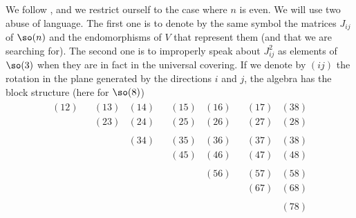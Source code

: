 We follow \cite{Dolan_son}, and we restrict ourself to the case where $n$ is even. We will use two abuse of language. The first one is to denote by the same symbol the matrices $J_{ij}$ of $\so(n)$ and the endomorphisms of $V$ that represent them (and that we are searching for). The second one is to improperly speak about $J_{ij}^2$ as elements of $\so(3)$ when they are in fact in the universal covering. If we denote by $(ij)$ the rotation in the plane generated by the directions $i$ and $j$, the algebra has the block structure (here for $\so(8)$)
\begin{equation}
	\begin{matrix}
		\begin{matrix}
			(12)\\\phantom{(12)}
		\end{matrix}
		&
		\boxed{
		\begin{matrix}
			(13)&(14)\\
			(23)&(24)
		\end{matrix}	
		}
		&
		\boxed{
		\begin{matrix}
			(15)&(16)\\
			(25)&(26)
		\end{matrix}	
		}
		&
		\boxed{
		\begin{matrix}
			(17)&(38)\\
			(27)&(28)
		\end{matrix}	
		}
		\\
		\begin{matrix}
			\phantom{(12)}\\\phantom{(33)}
		\end{matrix}
		&
		\begin{matrix}
			\phantom{(12)}&(34)\\\phantom{(45)}
		\end{matrix}
		&
		\boxed{
		\begin{matrix}
			(35)&(36)\\
			(45)&(46)
		\end{matrix}	
		}
		&
		\boxed{
		\begin{matrix}
			(37)&(38)\\
			(47)&(48)
		\end{matrix}	
		}
		\\
		&&
		\begin{matrix}
			\phantom{(12)}&(56)\\\phantom{(45)}
		\end{matrix}
		&
		\boxed{
		\begin{matrix}
			(57)&(58)\\
			(67)&(68)
		\end{matrix}	
		}
		\\
		&&&
		\begin{matrix}
			\phantom{(12)}&(78)
		\end{matrix}
	\end{matrix}
\end{equation}
